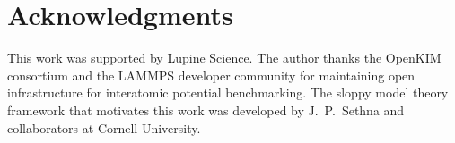 \documentclass[twocolumn,9pt]{extarticle}
\begin{document}
\section*{Acknowledgments}

This work was supported by Lupine Science. The author thanks the OpenKIM consortium and the LAMMPS developer community for maintaining open infrastructure for interatomic potential benchmarking. The sloppy model theory framework that motivates this work was developed by J.~P.~Sethna and collaborators at Cornell University.



\end{document}

